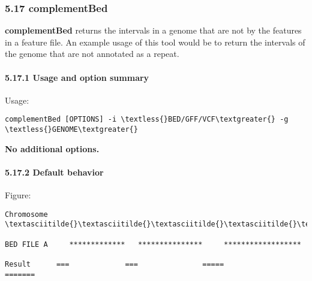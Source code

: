 \documentclass[letterpaper,10pt,english]{sphinxmanual}
\begin{document}
\subsubsection{5.17 complementBed}
\label{content/complementBed:complementbed}\label{content/complementBed::doc}
\textbf{complementBed} returns the intervals in a genome that are not by the features in a feature file. An
example usage of this tool would be to return the intervals of the genome that are not annotated as a
repeat.


\paragraph{5.17.1 Usage and option summary}
\label{content/complementBed:usage-and-option-summary}
Usage:

\begin{Verbatim}[commandchars=\\\{\}]
complementBed [OPTIONS] -i \textless{}BED/GFF/VCF\textgreater{} -g \textless{}GENOME\textgreater{}
\end{Verbatim}

\textbf{No additional options.}


\paragraph{5.17.2 Default behavior}
\label{content/complementBed:default-behavior}
Figure:

\begin{Verbatim}[commandchars=\\\{\}]
Chromosome  \textasciitilde{}\textasciitilde{}\textasciitilde{}\textasciitilde{}\textasciitilde{}\textasciitilde{}\textasciitilde{}\textasciitilde{}\textasciitilde{}\textasciitilde{}\textasciitilde{}\textasciitilde{}\textasciitilde{}\textasciitilde{}\textasciitilde{}\textasciitilde{}\textasciitilde{}\textasciitilde{}\textasciitilde{}\textasciitilde{}\textasciitilde{}\textasciitilde{}\textasciitilde{}\textasciitilde{}\textasciitilde{}\textasciitilde{}\textasciitilde{}\textasciitilde{}\textasciitilde{}\textasciitilde{}\textasciitilde{}\textasciitilde{}\textasciitilde{}\textasciitilde{}\textasciitilde{}\textasciitilde{}\textasciitilde{}\textasciitilde{}\textasciitilde{}\textasciitilde{}\textasciitilde{}\textasciitilde{}\textasciitilde{}\textasciitilde{}\textasciitilde{}\textasciitilde{}\textasciitilde{}\textasciitilde{}\textasciitilde{}\textasciitilde{}\textasciitilde{}\textasciitilde{}\textasciitilde{}\textasciitilde{}\textasciitilde{}\textasciitilde{}\textasciitilde{}\textasciitilde{}\textasciitilde{}\textasciitilde{}\textasciitilde{}\textasciitilde{}\textasciitilde{}\textasciitilde{}

BED FILE A     *************   ***************     ******************

Result      ===             ===               =====                  =======
\end{Verbatim}
\end{document}
